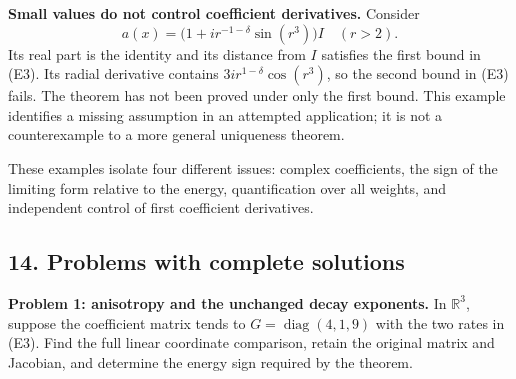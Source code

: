 \documentclass[
  11pt,
]{article}
\makeatletter
\let\ReaderOriginalAnchorStart\hyper@anchorstart
\let\ReaderOriginalAnchorEnd\hyper@anchorend
\let\ReaderPendingAliases\@empty
\def\ReaderArmAliases#1{\gdef\ReaderPendingAliases{#1}}
\def\hyper@anchorstart#1{\ReaderIfNativeAnchorTF{#1}{\ReaderPendingAliases\global\let\ReaderPendingAliases\@empty}{}\ReaderOriginalAnchorStart{#1}}
\makeatother
\begin{document}
\textbf{Small values do not control coefficient derivatives.} Consider
\[
               a(x)=\bigl(1+i r^{-1-\delta}\sin(r^3)\bigr)I
                 \quad(r>2).                                  \tag{E76}
\] Its real part is the identity and its distance from \(I\) satisfies
the first bound in (E3). Its radial derivative contains
\(3i r^{1-\delta}\cos(r^3)\), so the second bound in (E3) fails. The
theorem has not been proved under only the first bound. This example
identifies a missing assumption in an attempted application; it is not a
counterexample to a more general uniqueness theorem.

These examples isolate four different issues: complex coefficients, the
sign of the limiting form relative to the energy, quantification over
all weights, and independent control of first coefficient derivatives.

\ReaderArmAliases{\ReaderOriginalAnchorStart{AN03-EXU-014}\ReaderOriginalAnchorEnd\begingroup\expandafter\def\csname @currentHref\endcsname{AN03-EXU-014}\label{AN03-EXU-014}\endgroup\ReaderOriginalAnchorStart{an03-exu-014-problems-with-complete-solutions}\ReaderOriginalAnchorEnd\begingroup\expandafter\def\csname @currentHref\endcsname{an03-exu-014-problems-with-complete-solutions}\label{an03-exu-014-problems-with-complete-solutions}\endgroup\ReaderOriginalAnchorStart{14-problems-with-complete-solutions}\ReaderOriginalAnchorEnd\begingroup\expandafter\def\csname @currentHref\endcsname{14-problems-with-complete-solutions}\label{14-problems-with-complete-solutions}\endgroup\ReaderOriginalAnchorStart{problems-with-complete-solutions}\ReaderOriginalAnchorEnd}
\subsection{14. Problems with complete
solutions}\label{problems-with-complete-solutions}

\textbf{Problem 1: anisotropy and the unchanged decay exponents.} In
\(\mathbb R^3\), suppose the coefficient matrix tends to
\(G=\operatorname{diag}(4,1,9)\) with the two rates in (E3). Find the
full linear coordinate comparison, retain the original matrix and
Jacobian, and determine the energy sign required by the theorem.
\end{document}
